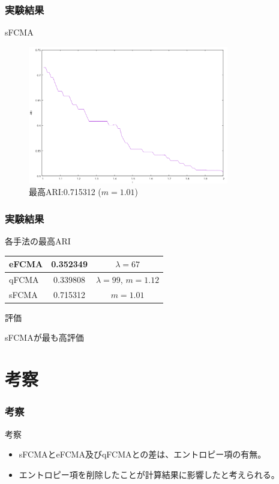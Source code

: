 \documentclass[13pt,dvipdfmx]{beamer}
\begin{document}
\begin{frame}\frametitle{実験結果}
  \begin{block}{sFCMA}
    \begin{figure}[htbp]
      \begin{center}
        \includegraphics[height=60mm]{sfcma_ARI.png}
      \end{center}
      \captionsetup{labelformat=empty,labelsep=none}
      \caption{最高ARI:0.715312 ($m=1.01$)}
    \end{figure}
  \end{block}
\end{frame}

\begin{frame}\frametitle{実験結果}
  \begin{block}{各手法の最高ARI}
    \vspace{5mm}
    \begin{table}
      \begin{tabular}{ l || c | c }\hline
        eFCMA & 0.352349 & $\lambda = 67$\\ \hline  
        qFCMA & 0.339808 & $\lambda = 99 $\;, \;$m = 1.12$\\  \hline
        sFCMA & 0.715312 & $m = 1.01$\\ \hline
      \end{tabular}
    \end{table}
  \end{block}
  \begin{block}{評価}
    \begin{center}
      sFCMAが最も高評価
    \end{center}
  \end{block}
\end{frame}

\section{考察}
\begin{frame}\frametitle{考察}
  \begin{block}{考察}
    \begin{itemize}
    \item sFCMAとeFCMA及びqFCMAとの差は、エントロピー項の有無。
    \item エントロピー項を削除したことが計算結果に影響したと考えられる。
    \end{itemize}
  \end{block}
\end{frame}
\end{document}
